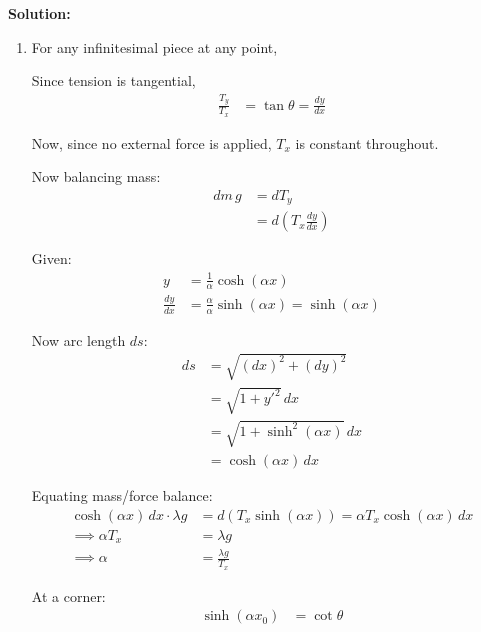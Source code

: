 \documentclass{article}
\theoremstyle{definition}
\newenvironment{solution}
  {\par\vspace{0.5em}\noindent\textbf{Solution:}\par\nopagebreak\vspace{0.3em}}
  {\par\vspace{1em}}
\begin{document}
\begin{solution}
\begin{enumerate}
        \vspace{1em}

        \item[\textbf{(b)}] For any infinitesimal piece at any point,

        \noindent
            \vspace{0pt}
            Since tension is tangential,
            \begin{align*}
                \frac{T_y}{T_x} &= \tan \theta = \frac{dy}{dx}
            \end{align*}

            Now, since no external force is applied, $T_x$ is constant throughout.
        

        Now balancing mass:
        \begin{align*}
            dm \, g &= d T_y \\
                    &= d \left( T_x \frac{dy}{dx} \right)
        \end{align*}

        Given:
        \begin{align*}
            y &= \frac{1}{\alpha} \cosh(\alpha x) \\
            \frac{dy}{dx} &= \frac{\alpha}{\alpha} \sinh(\alpha x) = \sinh(\alpha x)
        \end{align*}

        Now arc length $ds$:
        \begin{align*}
            ds &= \sqrt{(dx)^2 + (dy)^2} \\
               &= \sqrt{1 + {y'}^2} \, dx \\
               &= \sqrt{1 + \sinh^2(\alpha x)} \, dx \\
               &= \cosh(\alpha x) \, dx
        \end{align*}

        Equating mass/force balance:
        \begin{align*}
            \cosh(\alpha x) \, dx \cdot \lambda g &= d(T_x \sinh(\alpha x)) = \alpha T_x \cosh(\alpha x) \, dx \\
            \implies \alpha T_x &= \lambda g \\
            \implies \alpha &= \frac{\lambda g}{T_x}
        \end{align*}

        At a corner:
        \begin{align*}
            \sinh(\alpha x_0) &= \cot \theta
        \end{align*}


\end{enumerate}
\end{solution}
\end{document}
